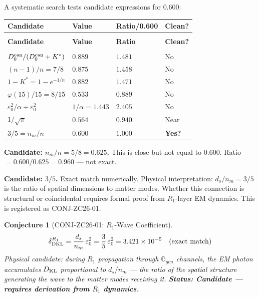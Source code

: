 \documentclass[12pt, a4paper]{article}
\newtheorem{conjecture}{Conjecture}[section]
\begin{document}
\begin{derivedbox}[title={FIND-ZC26-02: Coefficient $0.600$ Has
  No Closed Form in Current CRF}]
A systematic search tests candidate expressions for $0.600$:
{\small
\setlength{\LTpre}{4pt}
\setlength{\LTpost}{4pt}
\renewcommand{\arraystretch}{1.30}
\begin{longtable}{>{\raggedright\arraybackslash}p{5.5cm}
                  >{\centering\arraybackslash}p{2.5cm}
                  >{\centering\arraybackslash}p{2.0cm}
                  >{\centering\arraybackslash}p{1.5cm}}
\toprule
\textbf{Candidate} & \textbf{Value} & \textbf{Ratio/0.600} & \textbf{Clean?} \\
\midrule
\endfirsthead
\multicolumn{4}{l}{\small\textit{(continued)}}\\[4pt]
\toprule
\textbf{Candidate} & \textbf{Value} & \textbf{Ratio} & \textbf{Clean?} \\
\midrule
\endhead
\midrule
\multicolumn{4}{r}{\small\textit{(continues)}}\\
\endfoot
\bottomrule
\endlastfoot
$D_0^{\rm can}/(D_0^{\rm can}+K^*)$ & $0.889$ & $1.481$ & No \\
$(n-1)/n = 7/8$ & $0.875$ & $1.458$ & No \\
$1-K^* = 1-e^{-1/n}$ & $0.882$ & $1.471$ & No \\
$\varphi(15)/15 = 8/15$ & $0.533$ & $0.889$ & No \\
$\varepsilon_0^2/\alpha \div \varepsilon_0^2$ & $1/\alpha = 1.443$ & $2.405$ & No \\
$1/\sqrt{\pi}$ & $0.564$ & $0.940$ & Near \\
$3/5 = n_m/n$ & $0.600$ & $1.000$ & \textbf{Yes?} \\
\end{longtable}
}
\vspace{-6pt}

\textbf{Candidate: $n_m/n = 5/8 = 0.625$.} This is close but
not equal to $0.600$. Ratio $= 0.600/0.625 = 0.960$ --- not exact.

\textbf{Candidate: $3/5$.} Exact match numerically.
Physical interpretation: $d_s/n_m = 3/5$ is the ratio of
spatial dimensions to matter modes. Whether this connection
is structural or coincidental requires formal proof from
$R_1$-layer EM dynamics. This is registered as CONJ-ZC26-01.
\end{derivedbox}

\begin{conjecture}[CONJ-ZC26-01: $R_1$-Wave Coefficient]
\label{zc26:conj:r1coeff}
\[
  \delta_{\rm DKL}^{R_1}
  = \frac{d_s}{n_m}\,\varepsilon_0^2
  = \frac{3}{5}\,\varepsilon_0^2
  = 3.421\times10^{-5} \quad \text{(exact match)}
\]
Physical candidate: during $R_1$ propagation through
$\mathbb{G}_{gen}$ channels, the EM photon accumulates $D_{\rm KL}$
proportional to $d_s/n_m$ --- the ratio of the spatial structure
generating the wave to the matter modes receiving it.
\textbf{Status: Candidate --- requires derivation from $R_1$
  dynamics.}
\end{conjecture}
\end{document}
